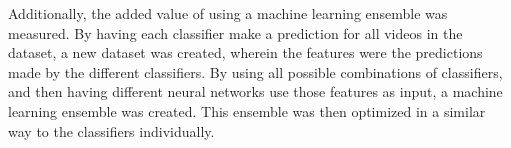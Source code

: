 \documentclass[../main.tex]{subfiles}
\begin{document}
Additionally, the added value of using a machine learning ensemble was measured. By having each classifier make a prediction for all videos in the dataset, a new dataset was created, wherein the features were the predictions made by the different classifiers. By using all possible combinations of classifiers, and then having different neural networks use those features as input, a machine learning ensemble was created. This ensemble was then optimized in a similar way to the classifiers individually.
\end{document}
